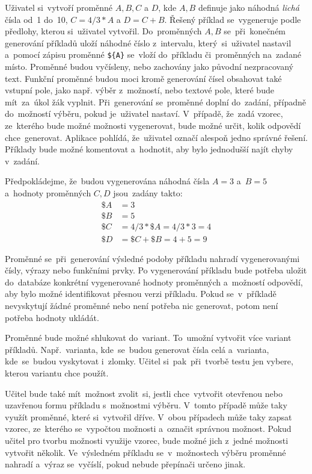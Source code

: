 \documentclass[10pt,a4paper]{article}
\begin{document}
        Uživatel si~vytvoří proměnné $A, B, C$ a $D$, kde $A, B$ definuje jako náhodná \emph{lichá} čísla od~1 do~10, $C = 4/3*A$ a $D = C + B$. Řešený příklad se~vygeneruje podle předlohy, kterou si~uživatel vytvořil. Do~proměnných $A, B$ se~při~konečném generování příkladů uloží náhodné číslo z~intervalu, který~si~uživatel nastavil a~pomocí zápisu proměnné \texttt{\$\{A\}} se~vloží do~příkladu či~proměnných na~zadané místo. Proměnné budou vyčísleny, nebo zachovány jako původní nezpracovaný text. Funkční proměnné budou moci kromě generování čísel obsahovat také vstupní pole, jako např. výběr z~možností, nebo textové pole, které bude mít~za~úkol žák vyplnit. Při~generování se~proměnné doplní do~zadání, případně do~možností výběru, pokud je~uživatel nastaví. V~případě, že~zadá vzorec, ze~kterého bude možné možnosti vygenerovat, bude možné určit, kolik odpovědí chce~generovat. Aplikace pohlídá, že~uživatel označí alespoň jedno správné řešení. Příklady bude možné komentovat a~hodnotit, aby bylo jednodušší najít chyby v~zadání.
        
        Předpokládejme, že~budou vygenerována náhodná čísla $A = 3$ a~$B = 5$ a~hodnoty proměnných $C, D$ jsou~zadány takto:
        \begin{align*}
            \$A &= 3 \\
            \$B &= 5 \\
            \$C &= 4/3*\$A = 4/3*3 = 4 \\
            \$D &= \$C + \$B = 4 + 5 = 9
        \end{align*}

        Proměnné se~při~generování výsledné podoby příkladu nahradí vygenerovanými čísly, výrazy nebo funkčními prvky. Po vygenerování příkladu bude potřeba uložit do~databáze konkrétní vygenerované hodnoty proměnných a~možností odpovědí, aby bylo možné identifikovat přesnou verzi příkladu. Pokud se~v~příkladě nevyskytují žádné proměnné nebo není potřeba nic generovat, potom není potřeba hodnoty ukládát.

        Proměnné bude možné shlukovat do~variant. To~umožní vytvořit více variant příkladů. Např.~varianta, kde~se~budou generovat čísla celá a~varianta, kde~se~budou vyskytovat i~zlomky. Učitel si~pak~při~tvorbě testu jen vybere, kterou variantu chce použít.

        Učitel bude také mít~možnost zvolit~si, jestli chce~vytvořit otevřenou nebo uzavřenou formu příkladu s~možnostmi výběru. V~tomto případě může taky využít proměnné, které si~vytvořil dříve. V~obou případech může taky zapsat vzorec, ze~kterého se~vypočtou možnosti a~označit správnou možnost. Pokud učitel pro tvorbu možnosti využije vzorec, bude možné jich z~jedné možnosti vytvořit několik. Ve~výsledném příkladu se~v~možnostech výběru proměnné nahradí a~výraz se~vyčíslí, pokud nebude přepínači určeno jinak.
\end{document}
